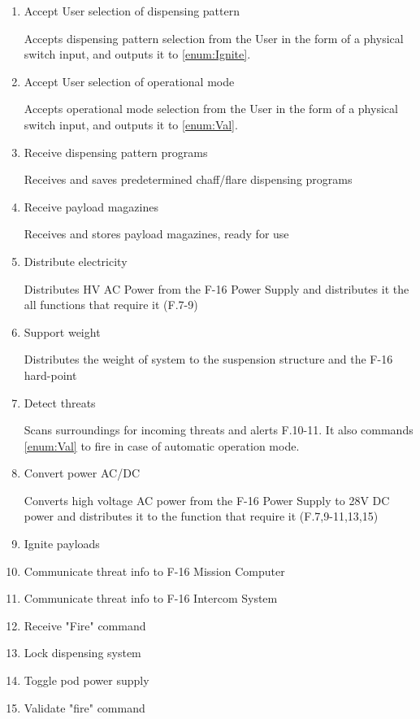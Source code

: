\documentclass[Main]{subfiles}
\begin{document}
\begin{enumerate}[label=F.\arabic*]
\item Accept User selection of dispensing pattern

Accepts dispensing pattern selection from the User in the form of a physical switch input, and outputs it to \ref{enum:Ignite}.

\item Accept User selection of operational mode

Accepts operational mode selection from the User in the form of a physical switch input, and outputs it to \ref{enum:Val}.

\item Receive dispensing pattern programs

Receives and saves predetermined chaff/flare dispensing programs

\item Receive payload magazines

Receives and stores payload magazines, ready for use

\item Distribute electricity

Distributes HV AC Power from the F-16 Power Supply and distributes it the all functions that require it (F.7-9)

\item Support weight

Distributes the weight of system to the suspension structure and the F-16 hard-point

\item Detect threats

Scans surroundings for incoming threats and alerts F.10-11. It also commands \ref{enum:Val} to fire in case of automatic operation mode.

\item Convert power AC/DC

Converts high voltage AC power from the F-16 Power Supply to 28V DC power and distributes it to the function that require it (F.7,9-11,13,15)

\item Ignite payloads\label{enum:Ignite}
\item Communicate threat info to F-16 Mission Computer
\item Communicate threat info to F-16 Intercom System
\item Receive "Fire" command
\item Lock dispensing system
\item Toggle pod power supply
\item Validate "fire" command\label{enum:Val}




\end{enumerate}
\end{document}
